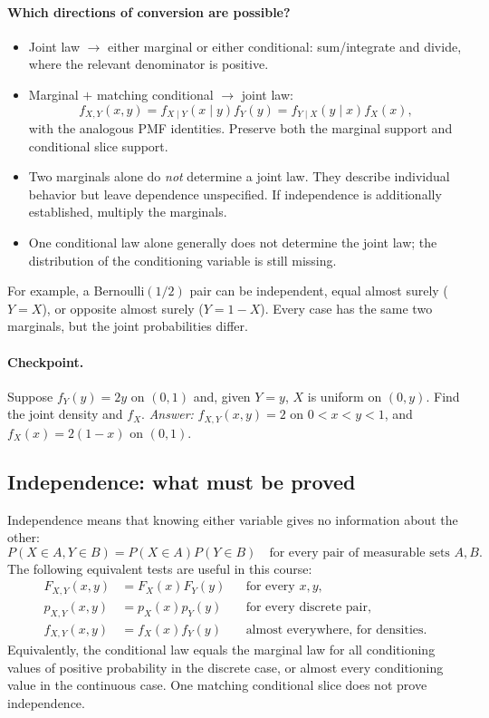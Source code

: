 \paragraph{Which directions of conversion are possible?}
\begin{itemize}[leftmargin=*]
\item Joint law $\longrightarrow$ either marginal or either conditional: sum/integrate and divide, where the relevant denominator is positive.
\item Marginal $+$ matching conditional $\longrightarrow$ joint law:
\[
 f_{X,Y}(x,y)=f_{X\mid Y}(x\mid y)f_Y(y)
 =f_{Y\mid X}(y\mid x)f_X(x),
\]
with the analogous PMF identities. Preserve both the marginal support and conditional slice support.
\item Two marginals alone do \emph{not} determine a joint law. They describe individual behavior but leave dependence unspecified. If independence is additionally established, multiply the marginals.
\item One conditional law alone generally does not determine the joint law; the distribution of the conditioning variable is still missing.
\end{itemize}
For example, a Bernoulli$(1/2)$ pair can be independent, equal almost surely ($Y=X$), or opposite almost surely ($Y=1-X$). Every case has the same two marginals, but the joint probabilities differ.

\paragraph{Checkpoint.} Suppose $f_Y(y)=2y$ on $(0,1)$ and, given $Y=y$, $X$ is uniform on $(0,y)$. Find the joint density and $f_X$. \emph{Answer:} $f_{X,Y}(x,y)=2$ on $0<x<y<1$, and $f_X(x)=2(1-x)$ on $(0,1)$.

\subsection{Independence: what must be proved}

Independence means that knowing either variable gives no information about the other:
\[
 P(X\in A,Y\in B)=P(X\in A)P(Y\in B)
 \quad\text{for every pair of measurable sets }A,B.
\]
The following equivalent tests are useful in this course:
\[
\begin{aligned}
F_{X,Y}(x,y)&=F_X(x)F_Y(y)&&\text{for every }x,y,\\
p_{X,Y}(x,y)&=p_X(x)p_Y(y)&&\text{for every discrete pair},\\
f_{X,Y}(x,y)&=f_X(x)f_Y(y)&&\text{almost everywhere, for densities}.
\end{aligned}
\]
Equivalently, the conditional law equals the marginal law for all conditioning values of positive probability in the discrete case, or almost every conditioning value in the continuous case. One matching conditional slice does not prove independence.

